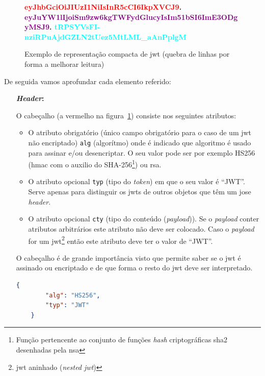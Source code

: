 \begin{figure}[H]
    \centering
    \textbf{\textcolor{red}{eyJhbGciOiJIUzI1NiIsInR5cCI6IkpXVCJ9}.
        \textcolor{purple}{eyJuYW1lIjoiSm9zw6kgTWFydGlucyIsIm51bSI6ImE3ODgyMSJ9}.
        \textcolor{cyan}{tRPSYVsFI-nziRPuAjdGZLN2tUez5MtLML\_aAnPplgM}
    }
    \caption{Exemplo de representação compacta de \acrshort{jwt} (quebra de linhas por forma a melhorar leitura)}\label{fig:exemjwt}
\end{figure}

De seguida vamos aprofundar cada elemento referido:
\begin{itemize}
    \item[\textbf{\textit{Header}:}]

    O cabeçalho (a vermelho na figura~\ref{fig:exemjwt}) consiste nos seguintes atributos:
    \begin{itemize}
        \item O atributo obrigatório (único campo obrigatório para o caso de um \acrshort{jwt} não encriptado) \texttt{alg} (algorítmo) onde é indicado que algoritmo é usado para assinar e/ou desencriptar. O seu valor pode ser por exemplo HS256 (\acrshort{hmac} com o auxilio do SHA-256\footnote{Função pertencente ao conjunto de funções \textit{hash} criptográficas \acrfull{sha2} desenhadas pela \acrshort{nsa}}) ou \acrshort{rsa}.
        \item O atributo opcional \texttt{typ} (tipo do \textit{token}) em que o seu valor é ``JWT''. Serve apenas para distinguir os \acrshort{jwt}s de outros objetos que têm um \acrshort{jose} \textit{header}.
        \item O atributo opcional \texttt{cty} (tipo do conteúdo (\textit{payload})). Se o \textit{payload} conter atributos arbitrários este atributo não deve ser colocado. Caso o \textit{payload} for um \acrshort{jwt}\footnote{\acrshort{jwt} aninhado (\textit{nested \acrshort{jwt}})} então este atributo deve ter o valor de ``JWT''.
    \end{itemize}

    O cabeçalho é de grande importância visto que permite saber se o \acrshort{jwt} é assinado ou encriptado e de que forma o resto do \acrshort{jwt} deve ser interpretado.

    \begin{lstlisting}[language=json, caption=\textit{Header} usado para construir o \acrshort{jwt} da figura~\ref{fig:exemjwt}]
    {
        "alg": "HS256",
        "typ": "JWT"
    }
    \end{lstlisting}


\end{itemize}
